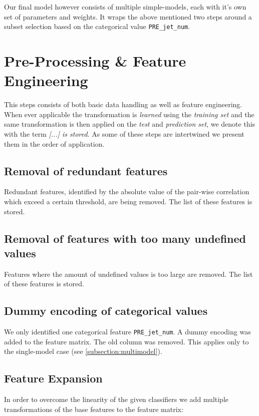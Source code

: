 \documentclass[a4paper, 10pt, conference]{ieeeconf}      %
\begin{document}
Our final model however consists of multiple simple-models, each with it's own
set of parameters and weights. It wraps the above mentioned two steps around a subset selection based on the categorical value \texttt{PRE\_jet\_num}.

\section{Pre-Processing \& Feature Engineering}

This steps consists of both basic data handling as well as feature engineering.
When ever applicable the transformation is \textit{learned} using the
\textit{training set} and the same transformation is then applied on the
\textit{test} and \textit{prediction set}, we denote this with the term \textit{[...] is stored}. As some of these steps are
intertwined we present them in the order of application.

\subsection{Removal of redundant features}

Redundant features, identified by the absolute value of the pair-wise
correlation which exceed a certain threshold, are being removed. The list of
these features is stored.

\subsection{Removal of features with too many undefined values}

Features where the amount of undefined values is too large are removed. The
list of these features is stored.

\subsection{Dummy encoding of categorical values}

We only identified one categorical feature \texttt{PRE\_jet\_num}. A dummy
encoding was added to the feature matrix. The old column was removed. This applies only to the single-model case (see \ref{subsection:multimodel}).

\subsection{Feature Expansion}

In order to overcome the linearity of the given classifiers we add multiple
transformations of the base features to the feature matrix:\\
\end{document}
